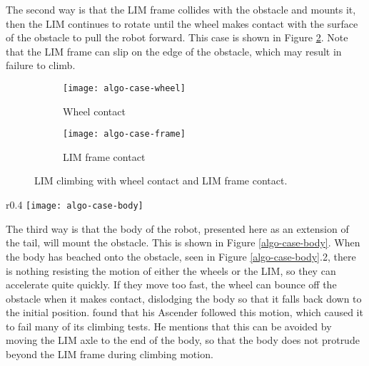 The second way is that the LIM frame collides with the obstacle and mounts it, then the LIM continues to rotate until the wheel makes contact with the surface of the obstacle to pull the robot forward. This case is shown in Figure \ref{algo-case-frame}. Note that the LIM frame can slip on the edge of the obstacle, which may result in failure to climb. \\
\begin{figure}
	\centering
	\begin{subfigure}{.5\textwidth}
		\centering
		\texttt{[image: algo-case-wheel]}
		\caption{Wheel contact}
		\label{algo-case-wheel}
	\end{subfigure}%
	\begin{subfigure}{.5\textwidth}
		\centering
		\texttt{[image: algo-case-frame]}
		\caption{LIM frame contact}
		\label{algo-case-frame}
	\end{subfigure}
	\caption{LIM climbing with wheel contact and LIM frame contact.}
	\label{fig:algo-climbing}
\end{figure}


\begin{wrapfigure}{r}{0.4\textwidth} %
	\centering
	\texttt{[image: algo-case-body]}
	\caption{LIM climbing with robot body contact.}
	\label{algo-case-body}
\end{wrapfigure}

The third way is that the body of the robot, presented here as an extension of the tail, will mount the obstacle. This is shown in Figure \ref{algo-case-body}.
When the body has beached onto the obstacle, seen in Figure \ref{algo-case-body}.2, there is nothing resisting the motion of either the wheels or the LIM, so they can accelerate quite quickly. If they move too fast, the wheel can bounce off the obstacle when it makes contact, dislodging the body so that it falls back down to the initial position. \cite{Buchanan-2018} found that his Ascender followed this motion, which caused it to fail many of its climbing tests. He mentions that this can be avoided by moving the LIM axle to the end of the body, so that the body does not protrude beyond the LIM frame during climbing motion.\\



